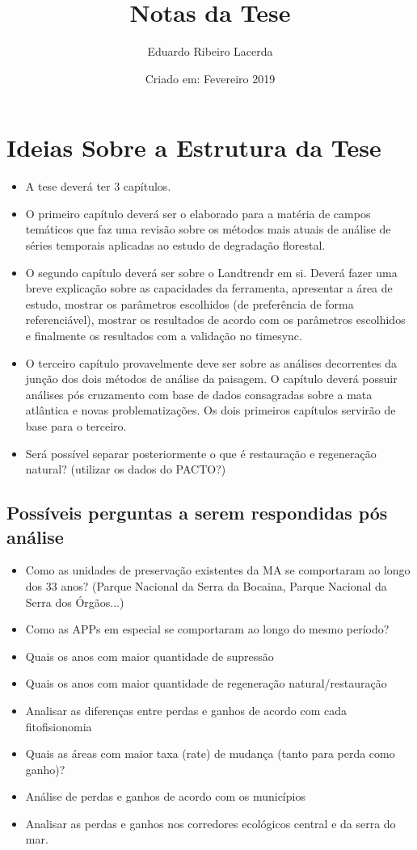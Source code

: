 \documentclass{article}
\title{Notas da Tese}
\author{Eduardo Ribeiro Lacerda }
\date{Criado em: Fevereiro 2019}
\begin{document}
\maketitle

\section{Ideias Sobre a Estrutura da Tese}
\begin{itemize}
    \item A tese deverá ter 3 capítulos.
    \item O primeiro capítulo deverá ser o elaborado para a matéria de campos temáticos que faz uma revisão sobre os métodos mais atuais de análise de séries temporais aplicadas ao estudo de degradação florestal.
    \item O segundo capítulo deverá ser sobre o Landtrendr em si. Deverá fazer uma breve explicação sobre as capacidades da ferramenta, apresentar a área de estudo, mostrar os parâmetros escolhidos (de preferência de forma referenciável), mostrar os resultados de acordo com os parâmetros escolhidos e finalmente os resultados com a validação no timesync.
    \item O terceiro capítulo provavelmente deve ser sobre as análises decorrentes da junção dos dois métodos de análise da paisagem. O capítulo deverá possuir análises pós cruzamento com base de dados consagradas sobre a mata atlântica e novas problematizações. Os dois primeiros capítulos servirão de base para o terceiro.  
    \item Será possível separar posteriormente o que é restauração e regeneração natural? (utilizar os dados do PACTO?)
\end{itemize}

\subsection{Possíveis perguntas a serem respondidas pós análise}
\begin{itemize}
    \item Como as unidades de preservação existentes da MA se comportaram ao longo dos 33 anos? (Parque Nacional da Serra da Bocaina, Parque Nacional da Serra dos Órgãos...)
    \item Como as APPs em especial se comportaram ao longo do mesmo período?
    \item Quais os anos com maior quantidade de supressão
    \item Quais os anos com maior quantidade de regeneração natural/restauração
    \item Analisar as diferenças entre perdas e ganhos de acordo com cada fitofisionomia
    \item Quais as áreas com maior taxa (rate) de mudança (tanto para perda como ganho)? 
    \item Análise de perdas e ganhos de acordo com os municípios
    \item Analisar as perdas e ganhos nos corredores ecológicos central e da serra do mar. 
\end{itemize}
\end{document}
